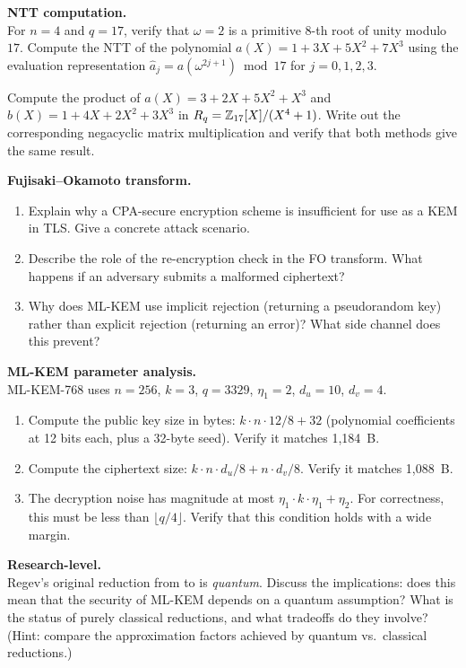 \begin{prob}
\label{prob:ch07-ntt}
\textbf{NTT computation.}\\
For $n = 4$ and $q = 17$, verify that $\omega = 2$ is a primitive $8$-th root of unity modulo~$17$.  Compute the NTT of the polynomial $a(X) = 1 + 3X + 5X^2 + 7X^3$ using the evaluation representation $\hat{a}_j = a(\omega^{2j+1}) \bmod 17$ for $j = 0,1,2,3$.
\end{prob}

\begin{prob}
\label{prob:ch07-ring-mult}
Compute the product of $a(X) = 3 + 2X + 5X^2 + X^3$ and $b(X) = 1 + 4X + 2X^2 + 3X^3$ in $R_q = \mathbb{Z}_{17}[X]/(X^4+1)$.  Write out the corresponding negacyclic matrix multiplication and verify that both methods give the same result.
\end{prob}

\begin{prob}
\label{prob:ch07-fo}
\textbf{Fujisaki--Okamoto transform.}
\begin{enumerate}
\item[(a)] Explain why a CPA-secure encryption scheme is insufficient for use as a KEM in TLS.  Give a concrete attack scenario.
\item[(b)] Describe the role of the re-encryption check in the FO transform.  What happens if an adversary submits a malformed ciphertext?
\item[(c)] Why does ML-KEM use implicit rejection (returning a pseudorandom key) rather than explicit rejection (returning an error)?  What side channel does this prevent?
\end{enumerate}
\end{prob}

\begin{prob}
\label{prob:ch07-params}
\textbf{ML-KEM parameter analysis.}\\
ML-KEM-768 uses $n = 256$, $k = 3$, $q = 3329$, $\eta_1 = 2$, $d_u = 10$, $d_v = 4$.
\begin{enumerate}
\item[(a)] Compute the public key size in bytes: $k \cdot n \cdot 12/8 + 32$ (polynomial coefficients at 12 bits each, plus a 32-byte seed).  Verify it matches 1,184~B.
\item[(b)] Compute the ciphertext size: $k \cdot n \cdot d_u / 8 + n \cdot d_v / 8$.  Verify it matches 1,088~B.
\item[(c)] The decryption noise has magnitude at most $\eta_1 \cdot k \cdot \eta_1 + \eta_2$.  For correctness, this must be less than $\lfloor q/4 \rfloor$.  Verify that this condition holds with a wide margin.
\end{enumerate}
\end{prob}

\begin{prob}
\label{prob:ch07-security}
\textbf{Research-level.}\\
Regev's original reduction from \gapsvp{} to \lwe{} is \emph{quantum}.  Discuss the implications: does this mean that the security of ML-KEM depends on a quantum assumption?  What is the status of purely classical reductions, and what tradeoffs do they involve?  (Hint: compare the approximation factors achieved by quantum vs.\ classical reductions.)
\end{prob}
